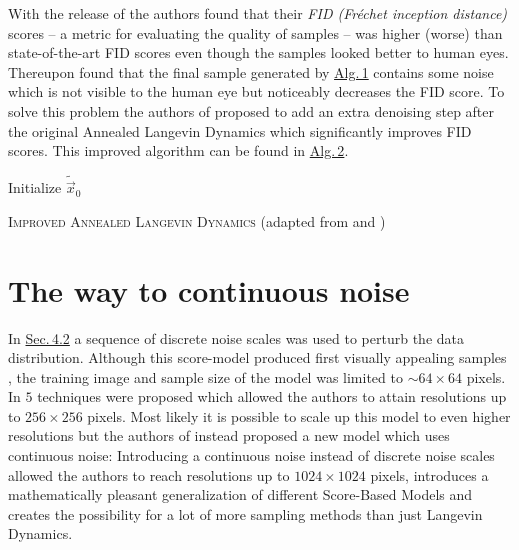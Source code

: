 With the release of \cite{score_1} the authors found that their \textit{FID (Fréchet inception distance)} \cite{fid} scores – a metric for evaluating the quality of samples – was higher (worse) than state-of-the-art FID scores even though the samples looked better to human eyes. Thereupon \cite{score_4} found that the final sample generated by \hyperref[alg:1]{Alg.\,1} contains some noise which is not visible to the human eye but noticeably decreases the FID score. To solve this problem the authors of \cite{score_4} proposed to add an extra denoising step after the original Annealed Langevin Dynamics which significantly improves FID scores. This improved algorithm can be found in \hyperref[alg:2]{Alg.\,2}.
%
\begin{algorithm} \label{alg:2}
    \DontPrintSemicolon
    Initialize $\tilde{\vec{x}}_0$\;
    
    \caption[Improved Annealed Langevin Dynamics]{\textsc{Improved Annealed Langevin Dynamics} (adapted from \cite{score_1} and \cite{score_4})}
\end{algorithm}
\section[The way to continuous noise]{The way to continuous noise%
    } \label{sec:4.4}
In \hyperref[sec:4.2]{Sec.\,4.2} a sequence of discrete noise scales was used to perturb the data distribution. Although this score-model produced first visually appealing samples \cite{score_1}, the training image and sample size of the model was limited to $\sim64\times64$ pixels. In \cite{score_2} $5$ techniques were proposed which allowed the authors to attain resolutions up to $256\times256$ pixels. Most likely it is possible to scale up this model to even higher resolutions but the authors of \cite{score_3} instead proposed a new model which uses continuous noise: Introducing a continuous noise \cite{score_3} instead of discrete noise scales allowed the authors to reach resolutions up to $1024\times1024$ pixels, introduces a mathematically pleasant generalization of different Score-Based Models and creates the possibility for a lot of more sampling methods than just Langevin Dynamics.
%

